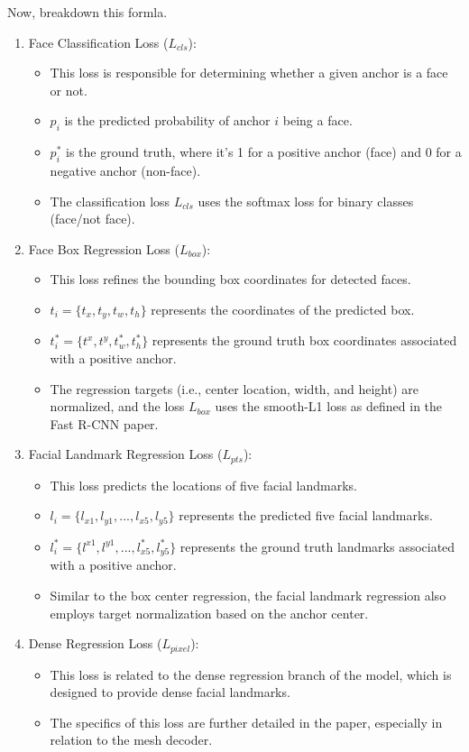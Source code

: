 \documentclass{article}
\begin{document}
Now, breakdown this formla.

\begin{enumerate}
  \item Face Classification Loss (\(L_{cls}\)):
  \begin{itemize}
    \item This loss is responsible for determining whether a given anchor is a face or not.
    \item \( p_i \) is the predicted probability of anchor \( i \) being a face.
    \item \( p^*_i \) is the ground truth, where it's 1 for a positive anchor (face) and 0 for a negative anchor (non-face).
    \item The classification loss \( L_{cls} \) uses the softmax loss for binary classes (face/not face).
  \end{itemize}
    \item Face Box Regression Loss (\(L_{box}\)):
    \begin{itemize}
      \item This loss refines the bounding box coordinates for detected faces.
      \item \( t_i = \{t_{x}, t_{y}, t_{w}, t_{h}\} \) represents the coordinates of the predicted box.
      \item \( t^*_i = \{t^{x}, t^{y}, t^*_{w}, t^*_{h}\} \) represents the ground truth box coordinates associated with a positive anchor.
      \item The regression targets (i.e., center location, width, and height) are normalized, and the loss \( L_{box} \) uses the smooth-L1 loss as defined in the Fast R-CNN paper.
    \end{itemize}
    \item Facial Landmark Regression Loss (\(L_{pts}\)):
    \begin{itemize}
      \item This loss predicts the locations of five facial landmarks.
      \item \( l_i = \{l_{x1}, l_{y1}, ..., l_{x5}, l_{y5}\} \) represents the predicted five facial landmarks.
      \item \( l^*_i = \{l^{x1}, l^{y1}, ..., l^*_{x5}, l^*_{y5}\} \) represents the ground truth landmarks associated with a positive anchor.
    \item Similar to the box center regression, the facial landmark regression also employs target normalization based on the anchor center.
    \end{itemize}
    \item Dense Regression Loss (\(L_{pixel}\)):
    \begin{itemize}
      \item This loss is related to the dense regression branch of the model, which is designed to provide dense facial landmarks.
      \item The specifics of this loss are further detailed in the paper, especially in relation to the mesh decoder.
    \end{itemize}
  \end{enumerate}
\end{document}

